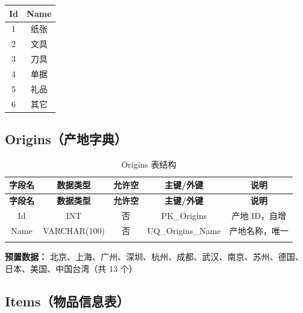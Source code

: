 \documentclass[12pt,a4paper]{ctexart}
\begin{document}
\begin{tabular}{c|c}
\toprule
\textbf{Id} & \textbf{Name} \\
\midrule
1 & 纸张 \\
2 & 文具 \\
3 & 刀具 \\
4 & 单据 \\
5 & 礼品 \\
6 & 其它 \\
\bottomrule
\end{tabular}

\subsection{Origins（产地字典）}

\begin{longtable}{c|c|c|c|c}
\toprule
\textbf{字段名} & \textbf{数据类型} & \textbf{允许空} & \textbf{主键/外键} & \textbf{说明} \\
\midrule
\endfirsthead
\toprule
\textbf{字段名} & \textbf{数据类型} & \textbf{允许空} & \textbf{主键/外键} & \textbf{说明} \\
\midrule
\endhead
Id   & INT & 否 & PK\_Origins & 产地 ID，自增 \\
Name & VARCHAR(100) & 否 & UQ\_Origins\_Name & 产地名称，唯一 \\
\bottomrule
\caption{Origins 表结构}
\end{longtable}

\vspace{4pt}
\textbf{预置数据：} 北京、上海、广州、深圳、杭州、成都、武汉、南京、苏州、德国、日本、美国、中国台湾（共 13 个）

\subsection{Items（物品信息表）}
\end{document}
